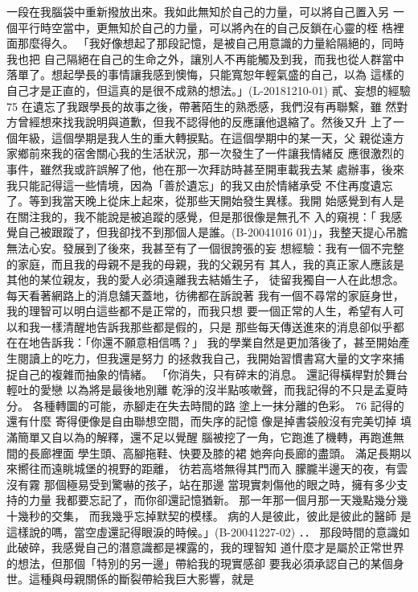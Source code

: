 一段在我腦袋中重新撥放出來。我如此無知於自己的力量，可以將自己置入另
一個平行時空當中，更無知於自己的力量，可以將內在的自己反鎖在心靈的桎
梏裡面那麼得久。 
「我好像想起了那段記憶，是被自己用意識的力量給隔絕的，同時我也把
自己隔絕在自己的生命之外，讓別人不再能觸及到我，而我也從人群當中
落單了。想起學長的事情讓我感到懊悔，只能寬恕年輕氣盛的自己，以為
這樣的自己才是正直的，但這真的是很不成熟的想法。」(L-20181210-01) 
貳、妄想的經驗 
75 
在遺忘了我跟學長的故事之後，帶著陌生的熟悉感，我們沒有再聯繫，雖
然對方曾經想來找我說明與道歉，但我不認得他的反應讓他退縮了。然後又升
上了一個年級，這個學期是我人生的重大轉捩點。在這個學期中的某一天，父
親從遠方家鄉前來我的宿舍關心我的生活狀況，那一次發生了一件讓我情緒反
應很激烈的事件，雖然我或許誤解了他，他在那一次拜訪時甚至開車載我去某
處辦事，後來我只能記得這一些情境，因為「善於遺忘」的我又由於情緒承受
不住再度遺忘了。等到我當天晚上從床上起來，從那些天開始發生異樣。我開
始感覺到有人是在關注我的，我不能說是被追蹤的感覺，但是那很像是無孔不
入的窺視：「 我感覺自己被跟蹤了，但我卻找不到那個人是誰。(B-20041016
01)」，我整天提心吊膽無法心安。發展到了後來，我甚至有了一個很誇張的妄
想經驗：我有一個不完整的家庭，而且我的母親不是我的母親，我的父親另有
其人，我的真正家人應該是其他的某位親友，我的愛人必須遠離我去結婚生子，
徒留我獨自一人在此想念。每天看著網路上的消息舖天蓋地，彷彿都在訴說著
我有一個不尋常的家庭身世，我的理智可以明白這些都不是正常的，而我只想
要一個正常的人生，希望有人可以和我一樣清醒地告訴我那些都是假的，只是
那些每天傳送進來的消息卻似乎都在在地告訴我：「你還不願意相信嗎？」 
我的學業自然是更加落後了，甚至開始產生閱讀上的吃力，但我還是努力
的拯救我自己，我開始習慣書寫大量的文字來捕捉自己的複雜而抽象的情緒。 
「你消失，只有碎末的消息。 
還記得橫桿對於舞台輕吐的愛戀 
以為將是最後地別離 
乾淨的沒半點咳嗽聲，而我記得的不只是孟夏時分。 
各種轉圜的可能，赤腳走在失去時間的路 
塗上一抹分離的色彩。 
76 
記得的還有什麼 
寄得便像是自由聯想空間，而失序的記憶 
像是掉書袋般沒有完美切掉 
填滿簡單又自以為的解釋，還不足以覺醒 
腦被挖了一角，它跑進了機轉，再跑進無間的長廊裡面 
學生頭、高腳拖鞋、快要及膝的裙 
她奔向長廊的盡頭。 
滿足長期以來嚮往而遠眺城堡的視野的距離， 
彷若高塔無得其門而入 
朦朧半邊天的夜，有雲沒有霧 
那個極易受到驚嚇的孩子，站在那邊 
當現實刺傷他的眼之時，擁有多少支持的力量 
我都要忘記了，而你卻還記憶猶新。 
那一年那一個月那一天幾點幾分幾十幾秒的交集， 
而我幾乎忘掉默契的模樣。 
病的人是彼此，彼此是彼此的醫師 
是這樣說的嗎，當空虛還記得眼淚的時候。」(B-20041227-02) 
．． 
那段時間的意識如此破碎，我感覺自己的潛意識都是裸露的，我的理智知
道什麼才是屬於正常世界的想法，但那個「特別的另一邊」帶給我的現實感卻
要我必須承認自己的某個身世。這種與母親關係的斷裂帶給我巨大影響，就是
